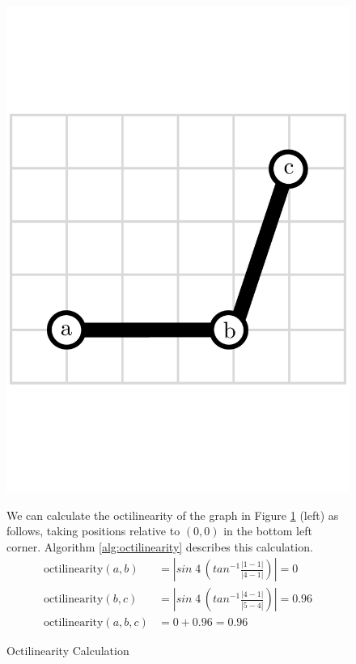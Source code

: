 \begin{figure}[h]
\centering
\begin{minipage}{.4\textwidth}
  \includegraphics[width=.9\linewidth]{img/implementation/octilinearity.pdf}\caption{Octilinearity Calculation\label{fig:octilinearity}}
  \end{minipage}\hspace{0.5cm}\begin{minipage}{.55\textwidth}
We can calculate the octilinearity of the graph in Figure \ref{fig:octilinearity} (left) as follows, taking positions relative to $(0, 0)$ in the bottom left corner. Algorithm \ref{alg:octilinearity} describes this calculation.
$$\begin{aligned}
\text{octilinearity}(a, b) &= |sin\;4\,(tan^{-1}\frac{|1 - 1|}{|4 - 1|})| = 0 \\
\text{octilinearity}(b, c) &= |sin\;4\,(tan^{-1}\frac{|4 - 1|}{|5 - 4|})| = 0.96 \\[0.1cm]
\text{octilinearity}(a, b, c) &= 0 + 0.96 = 0.96
\end{aligned}$$
\end{minipage}
\end{figure}

